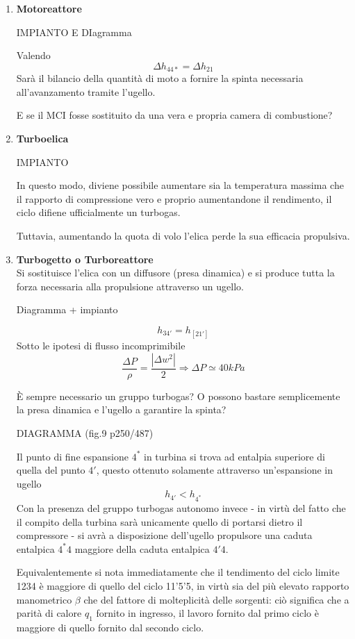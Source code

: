 \begin{adjustwidth}{2in}{}
\begin{enumerate}
		\item \textbf{Motoreattore} 
		
		IMPIANTO E DIagramma 
		
		Valendo 
		\[\Delta h_{44*} = \Delta h_{21}\]
		Sarà il bilancio della quantità di moto a fornire la spinta necessaria all'avanzamento tramite l'ugello. \newline 
		
		E se il MCI fosse sostituito da una vera e propria camera di combustione?
		
		\item \textbf{Turboelica}
		
		IMPIANTO
		
		In questo modo, diviene possibile aumentare sia la temperatura massima che il rapporto di compressione vero e proprio aumentandone il rendimento, il ciclo difiene ufficialmente un turbogas.
		
		Tuttavia, aumentando la quota di volo l'elica perde la sua efficacia propulsiva. 
		
		\item \textbf{Turbogetto o Turboreattore}\\
		
		Si sostituisce l'elica con un diffusore (presa dinamica) e si produce tutta la forza necessaria alla propulsione attraverso un ugello. 
		
		Diagramma + impianto
		
		\[ h_{34'} =  h_[21']\]
		Sotto le ipotesi di flusso incomprimibile
		\[\dfrac{\Delta P}{\rho} = \dfrac{|\Delta w^2|}{2} \Rightarrow \Delta P \simeq 40 kPa\]
		
		È sempre necessario un gruppo turbogas? O possono bastare semplicemente la presa dinamica e l'ugello a garantire la spinta? 
		
		DIAGRAMMA (fig.9 p250/487)
		
		Il punto di fine espansione $4^*$ in turbina si trova ad entalpia superiore di quella del punto $4'$, questo ottenuto solamente attraverso un'espansione in ugello
		\[h_{4'}<h_{4^*}\]
		Con la presenza del gruppo turbogas autonomo invece - in virtù del fatto che il compito della turbina sarà unicamente quello di portarsi dietro il compressore - si avrà a disposizione dell'ugello propulsore una caduta entalpica $4^*4$ maggiore della caduta entalpica $4'4$. 
		
		Equivalentemente si nota immediatamente che il tendimento del ciclo limite 1234 è maggiore di quello del ciclo 11'5'5, in virtù sia del più elevato rapporto manometrico $\beta$ che del fattore di molteplicità delle sorgenti: ciò significa che a parità di calore $q_1$ fornito in ingresso, il lavoro fornito dal primo ciclo è maggiore di quello fornito dal secondo ciclo. 
		

\end{enumerate}
\end{adjustwidth}
